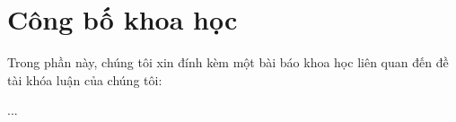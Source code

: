 \chapter{Công bố khoa học}
Trong phần này, chúng tôi xin đính kèm một bài báo khoa học liên quan đến đề tài khóa luận của chúng tôi:

...